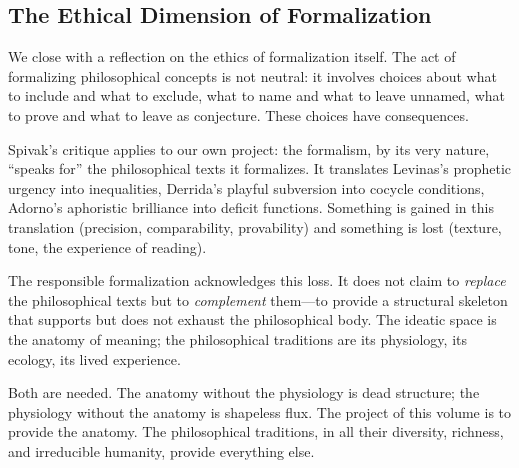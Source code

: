 \subsection{The Ethical Dimension of Formalization}

We close with a reflection on the ethics of formalization itself. The act of
formalizing philosophical concepts is not neutral: it involves choices about
what to include and what to exclude, what to name and what to leave unnamed,
what to prove and what to leave as conjecture. These choices have consequences.

Spivak's critique applies to our own project: the formalism, by its very
nature, ``speaks for'' the philosophical texts it formalizes. It translates
Levinas's prophetic urgency into inequalities, Derrida's playful subversion
into cocycle conditions, Adorno's aphoristic brilliance into deficit functions.
Something is gained in this translation (precision, comparability, provability)
and something is lost (texture, tone, the experience of reading).

The responsible formalization acknowledges this loss. It does not claim to
\emph{replace} the philosophical texts but to \emph{complement} them---to
provide a structural skeleton that supports but does not exhaust the
philosophical body. The ideatic space is the anatomy of meaning; the
philosophical traditions are its physiology, its ecology, its lived experience.

Both are needed. The anatomy without the physiology is dead structure;
the physiology without the anatomy is shapeless flux. The project of this
volume is to provide the anatomy. The philosophical traditions, in all their
diversity, richness, and irreducible humanity, provide everything else.

